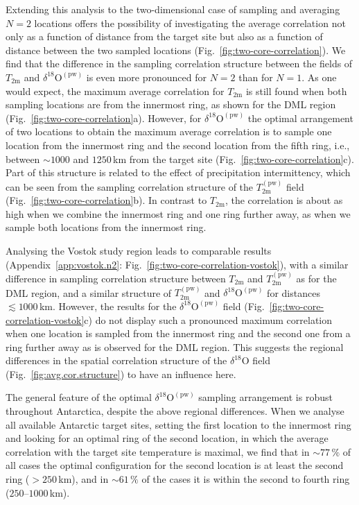 \documentclass[cp, manuscript]{copernicus}
\begin{document}
Extending this analysis to the two-dimensional case of sampling and averaging
$N=2$ locations offers the possibility of investigating the average correlation
not only as a function of distance from the target site but also as a function
of distance between the two sampled locations
(Fig.~\ref{fig:two-core-correlation}). We find that the difference in the
sampling correlation structure between the fields of $T_{\mathrm{2m}}$ and
$\delta^{18}\mathrm{O}^{\mathrm{(pw)}}$ is even more pronounced for $N=2$ than
for $N=1$. As one would expect, the maximum average correlation for
$T_{\mathrm{2m}}$ is still found when both sampling locations are from the
innermost ring, as shown for the DML region
(Fig.~\ref{fig:two-core-correlation}a). However, for
$\delta^{18}\mathrm{O}^{\mathrm{(pw)}}$ the optimal arrangement of two locations
to obtain the maximum average correlation is to sample one location from the
innermost ring and the second location from the fifth ring, i.e., between
$\sim1000$ and $1250$\,km from the target site
(Fig.~\ref{fig:two-core-correlation}c). Part of this structure is related to the
effect of precipitation intermittency, which can be seen from the sampling
correlation structure of the $T_{\mathrm{2m}}^{\mathrm{(pw)}}$ field
(Fig.~\ref{fig:two-core-correlation}b). In contrast to $T_{\mathrm{2m}}$, the
correlation is about as high when we combine the innermost ring and one ring
further away, as when we sample both locations from the innermost ring.

Analysing the Vostok study region leads to comparable results
(Appendix~\ref{app:vostok.n2}: Fig.~\ref{fig:two-core-correlation-vostok}), with
a similar difference in sampling correlation structure between $T_{\mathrm{2m}}$
and $T_{\mathrm{2m}}^{\mathrm{(pw)}}$ as for the DML region, and a similar
structure of $T_{\mathrm{2m}}^{\mathrm{(pw)}}$ and
$\delta^{18}\mathrm{O}^{\mathrm{(pw)}}$ for distances $\lesssim1000$\,km.
However, the results for the $\delta^{18}\mathrm{O}^{\mathrm{(pw)}}$ field
(Fig.~\ref{fig:two-core-correlation-vostok}c) do not display such a pronounced
maximum correlation when one location is sampled from the innermost ring and the
second one from a ring further away as is observed for the DML region. This
suggests the regional differences in the spatial correlation structure of the
$\delta^{18}\mathrm{O}$ field (Fig.~\ref{fig:avg.cor.structure}) to have an
influence here.

The general feature of the optimal $\delta^{18}\mathrm{O}^{\mathrm{(pw)}}$
sampling arrangement is robust throughout Antarctica, despite the above regional
differences. When we analyse all available Antarctic target sites, setting the
first location to the innermost ring and looking for an optimal ring of the
second location, in which the average correlation with the target site
temperature is maximal, we find that in $\sim77\,\%$ of all cases the optimal
configuration for the second location is at least the second ring ($>250$\,km),
and in $\sim61\,\%$ of the cases it is within the second to fourth ring
($250$--$1000$\,km).
\end{document}
